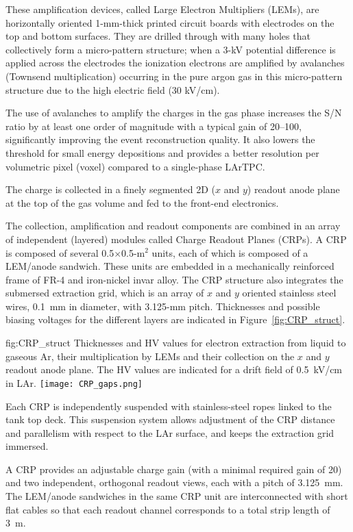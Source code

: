 These amplification devices, called Large Electron Multipliers (LEMs), are horizontally 
oriented 1-mm-thick printed 
circuit boards with electrodes on the top and bottom surfaces. They are drilled
through with many holes that collectively form a micro-pattern structure;  
when a 3-kV potential difference is applied across the electrodes
the ionization electrons are amplified by avalanches (Townsend multiplication) occurring in the 
pure argon gas in this micro-pattern structure due to the high electric field (30 kV/cm).

The use of avalanches to amplify the charges in the gas phase increases
the S/N ratio by at least one order of magnitude with a typical gain of 20--100, significantly
improving the event reconstruction quality. It also lowers the
threshold for small energy depositions and provides a better
resolution per volumetric pixel (voxel) compared to a single-phase
LArTPC. 

The charge is collected in a finely segmented 2D ($x$ and $y$) readout anode
plane at the top of the gas volume and fed to the front-end electronics.   

The  collection, amplification and readout components are combined in an array of 
independent (layered) modules called Charge Readout Planes (CRPs). A CRP is 
composed of several 0.5$\times$0.5-m$^2$ units, each of which is composed 
of a LEM/anode sandwich. 
These units are embedded in a mechanically reinforced frame of FR-4 and iron-nickel invar alloy. The CRP structure also integrates
 the submersed extraction grid, which is an array of $x$ and $y$ oriented stainless steel wires, 0.1~mm in diameter, with 3.125-mm
pitch. Thicknesses and possible biasing voltages for the different layers are indicated in Figure~\ref{fig:CRP_struct}.
\begin{dunefigure}{fig:CRP_struct}
{Thicknesses and HV values for electron extraction from liquid to gaseous Ar, their  multiplication by LEMs and their collection on the $x$ and $y$ readout anode plane. The HV values are indicated for a drift field of 0.5~kV/cm in LAr.}
\texttt{[image: CRP\_gaps.png]}
\end{dunefigure}

Each CRP is independently suspended with stainless-steel ropes linked to the tank top deck. This suspension system allows adjustment of the CRP distance and parallelism with respect to the LAr surface, and keeps the extraction grid immersed.

A CRP provides an adjustable charge gain (with a minimal required gain of 20) and two independent, orthogonal readout views, each with a pitch of 3.125~mm.  The LEM/anode sandwiches  in the same CRP unit are interconnected with short flat cables so that each readout channel corresponds to a total strip length of 3~m.

